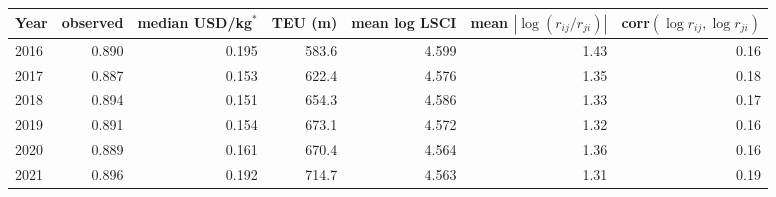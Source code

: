 \begin{tabular}{lrrrrrr}
\toprule
Year & observed & median USD/kg$^\ast$ & TEU (m) & mean log LSCI & mean $|\log(r_{ij}/r_{ji})|$ & corr$(\log r_{ij},\log r_{ji})$\\
\midrule
2016 & 0.890 & 0.195 & 583.6 & 4.599 & 1.43 & 0.16\\
2017 & 0.887 & 0.153 & 622.4 & 4.576 & 1.35 & 0.18\\
2018 & 0.894 & 0.151 & 654.3 & 4.586 & 1.33 & 0.17\\
2019 & 0.891 & 0.154 & 673.1 & 4.572 & 1.32 & 0.16\\
2020 & 0.889 & 0.161 & 670.4 & 4.564 & 1.36 & 0.16\\
2021 & 0.896 & 0.192 & 714.7 & 4.563 & 1.31 & 0.19\\
\bottomrule
\end{tabular}
